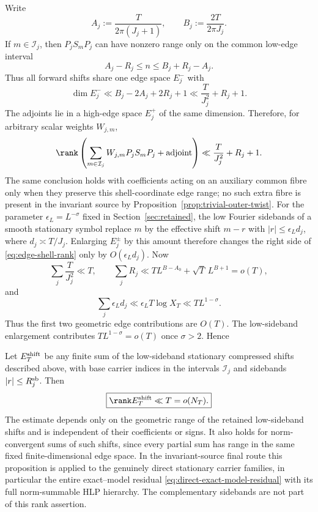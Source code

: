 Write
\[
A_j:=\frac{T}{2\pi(J_j+1)},
\qquad
B_j:=\frac{2T}{2\pi J_j}.
\]
If $m\in\mathcal I_j$, then $P_jS_mP_j$ can have nonzero range only on the
common low-edge interval
\[
A_j-R_j\le n\le B_j+R_j-A_j.
\]
Thus all forward shifts share one edge space $E_j^-$ with
\begin{equation}
\boxed{
\dim E_j^-
\ll B_j-2A_j+2R_j+1
\ll \frac{T}{J_j^2}+R_j+1.
}
\label{eq:edge-shell-dimension}
\end{equation}
The adjoints lie in a high-edge space $E_j^+$ of the same dimension. Therefore,
for arbitrary scalar weights $W_{j,m}$,
\begin{equation}
\rank\left(
\sum_{m\in\mathcal I_j}W_{j,m}P_jS_mP_j+\mathrm{adjoint}
\right)
\ll
\frac{T}{J_j^2}+R_j+1.
\label{eq:edge-shell-rank}
\end{equation}
The same conclusion holds with coefficients acting on an auxiliary common fibre
only when they preserve this shell-coordinate edge range; no such extra fibre is
present in the invariant source by Proposition~\ref{prop:trivial-outer-twist}.
For the parameter $\epsilon_L=L^{-\sigma}$ fixed in
Section~\ref{sec:retained}, the low Fourier sidebands of a smooth stationary
symbol replace $m$ by the effective shift $m-r$ with
$|r|\le\epsilon_Ld_j$, where $d_j\asymp T/J_j$. Enlarging $E_j^\pm$ by this amount therefore changes the
right side of \eqref{eq:edge-shell-rank} only by $O(\epsilon_Ld_j)$. Now
\[
\sum_j\frac{T}{J_j^2}\ll T,
\qquad
\sum_jR_j
\ll T L^{B-A_0}+\sqrt T\,L^{B+1}=o(T),
\]
and
\[
\sum_j\epsilon_Ld_j
\ll \epsilon_LT\log X_T
\ll T L^{1-\sigma}.
\]
Thus the first two geometric edge contributions are $O(T)$. The low-sideband
enlargement contributes $T L^{1-\sigma}=o(T)$ once $\sigma>2$. Hence
\begin{proposition}
\label{prop:edge-rank}
Let $E_T^{\rm shift}$ be any finite sum of the low-sideband stationary
compressed shifts described above, with base carrier indices in the intervals
$\mathcal I_j$ and sidebands $|r|\le R_j^{\rm sb}$. Then
\begin{equation}
\boxed{
\rank E_T^{\rm shift}
\ll T=o(N_T).
}
\label{eq:edge-rank-detailed}
\end{equation}
The estimate depends only on the geometric range of the retained low-sideband
shifts and is independent of their coefficients or signs. It also holds for
norm-convergent sums of such shifts, since every partial sum has range in the
same fixed finite-dimensional edge space.  In the invariant-source final route
this proposition is applied to the genuinely direct stationary carrier
families, in particular the entire exact--model residual
\eqref{eq:direct-exact-model-residual} with its full norm-summable HLP
hierarchy. The complementary sidebands are not part of this rank assertion.
\end{proposition}

